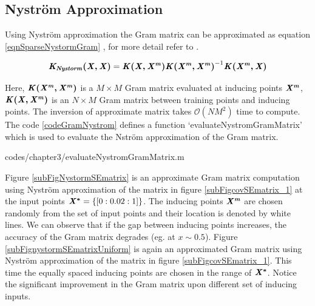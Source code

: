 \subsection{Nystr\"{o}m Approximation}\label{subSecNystrom} 

Using Nystr\"{o}m approximation the Gram matrix can be approximated as equation \ref{eqnSparseNystormGram} \cite{quinonero2005unifying, seeger2003fast}, for more detail refer to \cite{williams2001using}. 

\begin{equation}\label{eqnSparseNystormGram}
\bm{\mathit{K_{Nystorm}(X, X)}} = \bm{\mathit{K(X, X^{m})}} \bm{\mathit{K(X^{m}, X^{m})}}^{-1} \bm{\mathit{K(X^{m}, X)}}
\end{equation}

Here, $\bm{\mathit{K(X^{m}, X^{m})}}$ is a $M \times M$ Gram matrix evaluated at inducing points $\bm{\mathit{X^{m}}}$, $\bm{\mathit{K(X, X^{m})}}$ is an $N \times M$ Gram matrix between training points and inducing points. The inversion of approximate matrix takes $\mathcal{O}\left ( NM^{2} \right )$ time to compute. The code \ref{codeGramNystrom} defines a function `evaluateNystromGramMatrix' which is used to evaluate the Nstr\"{o}m approximation of the Gram matrix. 

\begin{mdframed}[hidealllines=true,backgroundcolor=lightgray!20]

                    {codes/chapter3/evaluateNystromGramMatrix.m}
\end{mdframed}


Figure \ref{subFigNystormSEmatrix} is an approximate Gram matrix computation using Nystr\"{o}m approximation of the matrix in figure \ref{subFigcovSEmatrix_1} at the input points $\bm{\mathit{X^{*}}} = \{[0:0.02:1]\}$. The inducing points $\bm{\mathit{X^{m}}}$ are chosen randomly from the set of input points and their location is denoted by white lines. We can observe that if the gap between inducing points increases, the accuracy of the Gram matrix degrades (eg. at $x \sim 0.5$). Figure \ref{subFignystormSEmatrixUniform} is again an approximated Gram matrix using Nystr\"{o}m approximation of the matrix in figure \ref{subFigcovSEmatrix_1}. This time the equally spaced inducing points are chosen in the range of $\bm{\mathit{X^{*}}}$. Notice the significant improvement in the Gram matrix upon different set of inducing inputs.

